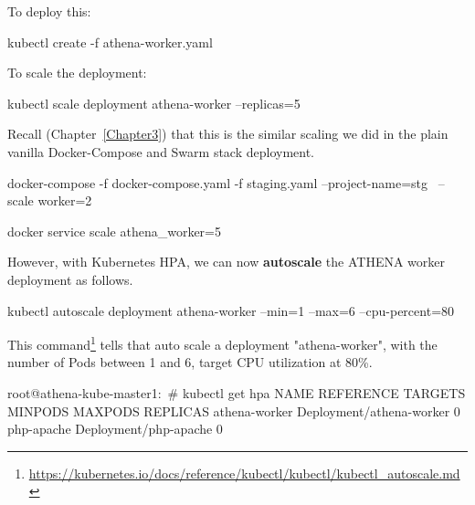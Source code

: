 \noindent To deploy this:

\begin{small}
\begin{lcverbatim}
kubectl create -f athena-worker.yaml
\end{lcverbatim}
\end{small}

\noindent To scale the deployment:
\begin{small}
\begin{lcverbatim}
kubectl scale deployment athena-worker --replicas=5
\end{lcverbatim}
\end{small}

\noindent Recall (Chapter~\ref{Chapter3}) that this is the similar scaling we did in the plain vanilla Docker-Compose and Swarm stack deployment.

\begin{small}
\begin{lcverbatim}
docker-compose -f docker-compose.yaml -f staging.yaml  --project-name=stg \
   --scale worker=2

docker service scale athena_worker=5   
\end{lcverbatim}
\end{small}

However, with Kubernetes HPA, we can now \textbf{autoscale} the ATHENA worker deployment as follows.
\begin{small}
\begin{lcverbatim}
kubectl autoscale deployment athena-worker --min=1 --max=6 --cpu-percent=80
\end{lcverbatim}
\end{small}

This command\footnote{\url{https://kubernetes.io/docs/reference/kubectl/kubectl/kubectl_autoscale.md}} tells that auto scale a deployment "athena-worker", with the number of Pods between 1 and 6, target CPU utilization at 80\%.

\begin{small}
\begin{lcverbatim}
root@athena-kube-master1:~# kubectl get hpa
NAME            REFERENCE                  TARGETS   MINPODS   MAXPODS   REPLICAS
athena-worker   Deployment/athena-worker   0%
php-apache      Deployment/php-apache      0%
\end{lcverbatim}
\end{small}


